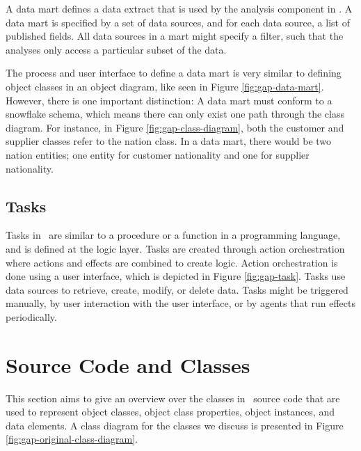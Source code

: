 A data mart defines a data extract that is used by the analysis component in \gap. A data mart is specified by a set of data sources, and for each data source, a list of published fields. All data sources in a mart might specify a filter, such that the analyses only access a particular subset of the data. 

The process and user interface to define a data mart is very similar to defining object classes in an object diagram, like seen in Figure \ref{fig:gap-data-mart}. However, there is one important distinction: A data mart must conform to a snowflake schema, which means there can only exist one path through the class diagram. For instance, in Figure \ref{fig:gap-class-diagram}, both the customer and supplier classes refer to the nation class. In a data mart, there would be two nation entities; one entity for customer nationality and one for supplier nationality.

\subsection{Tasks}
\label{sub:Tasks}
Tasks in \gap~are similar to a procedure or a function in a programming language, and is defined at the logic layer. Tasks are created through action orchestration where actions and effects are combined to create logic. Action orchestration is done using a user interface, which is depicted in Figure \ref{fig:gap-task}. Tasks use data sources to retrieve, create, modify, or delete data. Tasks might be triggered manually, by user interaction with the user interface, or by agents that run effects periodically. 

\section{Source Code and Classes}
\label{sec:Source Code and Classes}
This section aims to give an overview over the classes in \gap~source code that are used to represent object classes, object class properties, object instances, and data elements. A class diagram for the classes we discuss is presented in Figure \ref{fig:gap-original-class-diagram}.


